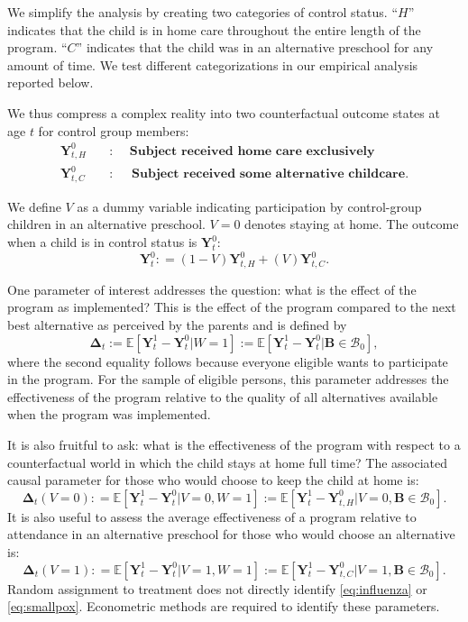 We simplify the analysis by creating two categories of control status. ``$H$'' indicates that the child is in home care throughout the entire length of the program. ``$C$'' indicates that the child was in an alternative preschool for any amount of time. We test different categorizations in our empirical analysis reported below.

We thus compress a complex reality into two counterfactual outcome states at age $t$ for control group members:
\begin{align*}
\bm{Y}_{t,H}^0 \quad &: \quad \textbf{ Subject received home care exclusively} \\
\bm{Y}_{t,C}^0 \quad &: \quad \textbf{ Subject received some alternative childcare}.
\end{align*}

We define $V$ as a dummy variable indicating participation by control-group children in an alternative preschool. $V=0$ denotes staying at home. The outcome when a child is in control status is $\bm{Y}^0_t$:
\begin{equation}
\bm{Y}^0_t : = \left( 1 - V \right) \bm{Y}^0_{t,H} + \left( V \right) \bm{Y}^0_{t,C}.
\end{equation}

One parameter of interest addresses the question: what is the effect of the program as implemented? This is the effect of the program compared to the next best alternative as perceived by the parents and is defined by
\begin{equation}\label{eq:effect}
\bm{\Delta}_t := \mathbb{E} \left[ \bm{Y}^1_t -  \bm{Y}^0_t | W =1 \right] := \mathbb{E} \left[\bm{Y}^1_t - \bm{Y}^0_t | \bm{B} \in \mathcal{B}_0 \right],
\end{equation}
where the second equality follows because everyone eligible wants to participate in the program. For the sample of eligible persons, this parameter addresses the effectiveness of the program relative to the quality of all alternatives available when the program was implemented.

It is also fruitful to ask: what is the effectiveness of the program with respect to a counterfactual world in which the child stays at home full time? The associated causal parameter for those who would choose to keep the child at home is:
\begin{equation}\label{eq:influenza}
\bm{\Delta}_t \left(V = 0 \right) : =   \mathbb{E} \left[ \bm{Y}^1_t - \bm{Y}^0_t | V = 0, W = 1 \right] := \mathbb{E} \left[\bm{Y}^1_{t} - \bm{Y}^0_{t,H} | V = 0, \bm{B} \in \mathcal{B}_0 \right].
\end{equation}
It is also useful to assess the average effectiveness of a program relative to attendance in an alternative preschool for those who would choose an alternative is:
\begin{equation}\label{eq:smallpox}
\bm{\Delta}_t \left( V =1 \right) : =   \mathbb{E} \left[ \bm{Y}^1_t - \bm{Y}^0_t | V = 1, W = 1 \right] := \mathbb{E} \left[\bm{Y}^1_t - \bm{Y}^0_{t,C} | V = 1, \bm{B} \in \mathcal{B}_0 \right].
\end{equation}
Random assignment to treatment does not directly identify \eqref{eq:influenza} or \eqref{eq:smallpox}. Econometric methods are required to identify these parameters.

